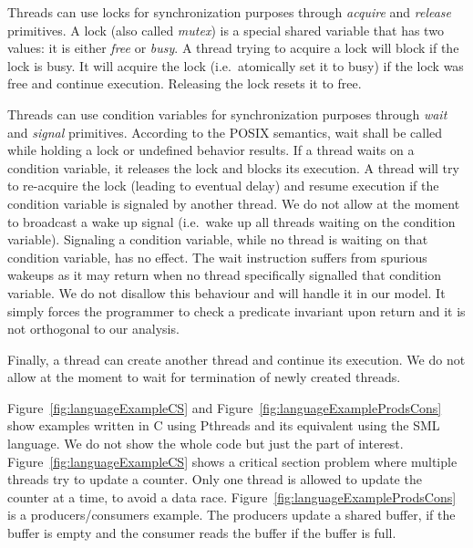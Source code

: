 Threads can use locks for synchronization purposes through
\emph{acquire} and \emph{release} primitives. A lock (also called
\emph{mutex}) is a special shared variable that has two values: it is
either \emph{free} or \emph{busy}. A thread trying to acquire a lock
will block if the lock is busy. It will acquire the lock (i.e.\
atomically set it to busy) if the lock was free and continue
execution. Releasing the lock resets it to free.

Threads can use condition variables for synchronization purposes
through \emph{wait} and \emph{signal} primitives.
%
According to the POSIX semantics, wait shall be called while holding a
lock or undefined behavior results.  If a thread waits on a condition
variable, it releases the lock and blocks its execution. A thread will
try to re-acquire the lock (leading to eventual delay) and resume
execution if the condition variable is signaled by another thread.
%
We do not allow at the moment to broadcast a wake up signal (i.e.\
wake up all threads waiting on the condition variable). Signaling a
condition variable, while no thread is waiting on that condition
variable, has no effect.
%
The wait instruction suffers from spurious wakeups as it may return
when no thread specifically signalled that condition variable. We do
not disallow this behaviour and will handle it in our model. It simply
forces the programmer to check a predicate invariant %
upon return and it is not orthogonal to our analysis.

Finally, a thread can create another thread and continue its
execution.
%
%
We do not allow at the moment to wait for termination of newly created
threads.


Figure~\ref{fig:languageExampleCS} and
Figure~\ref{fig:languageExampleProdsCons} show examples written in C
using Pthreads and its equivalent using the SML language. We do not
show the whole code but just the part of interest.
%
Figure~\ref{fig:languageExampleCS} shows a critical section problem
where multiple threads try to update a counter. Only one thread is
allowed to update the counter at a time, to avoid a data race.
%
Figure~\ref{fig:languageExampleProdsCons} is a producers/consumers
example. The producers update a shared buffer, if the buffer is empty
and the consumer reads the buffer if the buffer is full.


